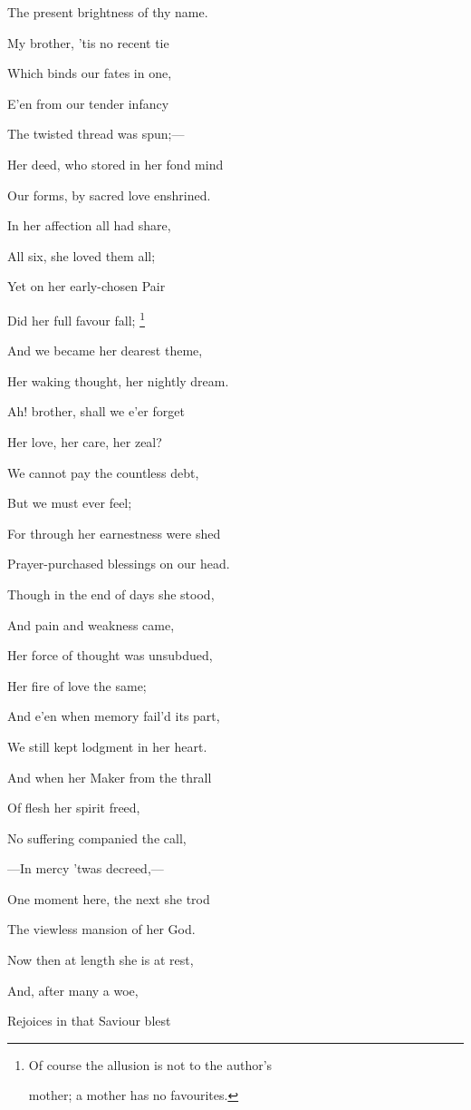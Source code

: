 The present brightness of thy name.

My brother, 'tis no recent tie

Which binds our fates in
one,

E'en from our tender infancy

The twisted thread was
spun;—

Her deed, who stored in her fond mind

Our forms, by sacred love enshrined.

In her affection all had share,

All six, she loved them
all;

Yet on her early-chosen Pair

Did her full favour fall;
\footnote{Of course the allusion is not to the author's

mother; a mother has no favourites.}

And we became her dearest theme,

Her waking thought, her nightly dream.

Ah! brother, shall we e'er forget

Her love, her care, her
zeal?

We cannot pay the countless debt,

But we must ever feel;

For through her earnestness were shed

Prayer-purchased blessings on our head.

Though in the end of days she stood,

And pain and weakness
came,

Her force of thought was unsubdued,

Her fire of love the
same;

And e'en when memory fail'd its part,

We still kept lodgment in her heart.

And when her Maker from the thrall

Of flesh her spirit
freed,

No suffering companied the call,

—In mercy 'twas
decreed,—

One moment here, the next she trod

The viewless mansion of her God.

Now then at length she is at rest,

And, after many a woe,

Rejoices in that Saviour blest

